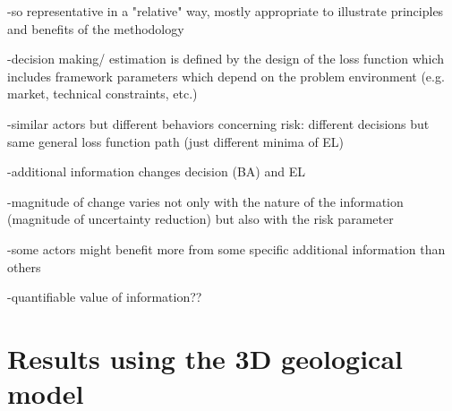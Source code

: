 			-so representative in a "relative" way, mostly appropriate to illustrate principles and benefits of the methodology
			
			-decision making/ estimation is defined by the design of the loss function which includes framework parameters which depend on the problem environment (e.g. market, technical constraints, etc.)
		
			-similar actors but different behaviors concerning risk: different decisions but same general loss function path (just different minima of EL)
		
			-additional information changes decision (BA) and EL
		
			-magnitude of change varies not only with the nature of the information (magnitude of uncertainty reduction) but also with the risk parameter
		
			-some actors might benefit more from some specific additional information than others
		
			-quantifiable value of information??
				
		\section{Results using the 3D geological model}
		